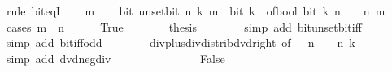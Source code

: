 \begin{isabellebody}
%
\isadelimproof
%
\endisadelimproof
%
\isatagproof
{}\isamarkupfalse%
\ {\isacharparenleft}{\kern0pt}rule\ bit{\isacharunderscore}{\kern0pt}eqI{\isacharparenright}{\kern0pt}\isanewline
\ \ \isamarkupfalse%
\ m\isanewline
\ \ \isamarkupfalse%
\ {\isacartoucheopen}bit\ {\isacharparenleft}{\kern0pt}unset{\isacharunderscore}{\kern0pt}bit\ n\ k{\isacharparenright}{\kern0pt}\ m\ {\isasymlongleftrightarrow}\ bit\ {\isacharparenleft}{\kern0pt}k\ {\isacharminus}{\kern0pt}\ of{\isacharunderscore}{\kern0pt}bool\ {\isacharparenleft}{\kern0pt}bit\ k\ n{\isacharparenright}{\kern0pt}\ {\isacharasterisk}{\kern0pt}\ {}\ {\isacharcircum}{\kern0pt}\ n{\isacharparenright}{\kern0pt}\ m{\isacartoucheclose}\isanewline
\ \ \isamarkupfalse%
\ {\isacharparenleft}{\kern0pt}cases\ {\isacartoucheopen}m\ {\isacharequal}{\kern0pt}\ n{\isacartoucheclose}{\isacharparenright}{\kern0pt}\isanewline
\ \ \ \ \isamarkupfalse%
\ True\isanewline
\ \ \ \ \isamarkupfalse%
\ \isamarkupfalse%
\ {\isacharquery}{\kern0pt}thesis\isanewline
\ \ \ \ \ \ \isamarkupfalse%
\ {\isacharparenleft}{\kern0pt}simp\ add{\isacharcolon}{\kern0pt}\ bit{\isacharunderscore}{\kern0pt}unset{\isacharunderscore}{\kern0pt}bit{\isacharunderscore}{\kern0pt}iff{\isacharparenright}{\kern0pt}\isanewline
\ \ \ \ \ \ \isamarkupfalse%
\ {\isacharparenleft}{\kern0pt}simp\ add{\isacharcolon}{\kern0pt}\ bit{\isacharunderscore}{\kern0pt}iff{\isacharunderscore}{\kern0pt}odd{\isacharparenright}{\kern0pt}\isanewline
\ \ \ \ \ \ \isamarkupfalse%
\ div{\isacharunderscore}{\kern0pt}plus{\isacharunderscore}{\kern0pt}div{\isacharunderscore}{\kern0pt}distrib{\isacharunderscore}{\kern0pt}dvd{\isacharunderscore}{\kern0pt}right\ {\isacharbrackleft}{\kern0pt}of\ {\isacartoucheopen}{}\ {\isacharcircum}{\kern0pt}\ n{\isacartoucheclose}\ {\isacartoucheopen}{\isacharminus}{\kern0pt}\ {\isacharparenleft}{\kern0pt}{}\ {\isacharcircum}{\kern0pt}\ n{\isacharparenright}{\kern0pt}{\isacartoucheclose}\ k{\isacharbrackright}{\kern0pt}\isanewline
\ \ \ \ \ \ \isamarkupfalse%
\ {\isacharparenleft}{\kern0pt}simp\ add{\isacharcolon}{\kern0pt}\ dvd{\isacharunderscore}{\kern0pt}neg{\isacharunderscore}{\kern0pt}div{\isacharparenright}{\kern0pt}\isanewline
\ \ \ \ \ \ \isamarkupfalse%
\isanewline
\ \ \isamarkupfalse%
\isanewline
\ \ \ \ \isamarkupfalse%
\ False\isanewline
\ \ \ \ \isamarkupfalse%

\end{isabellebody}
